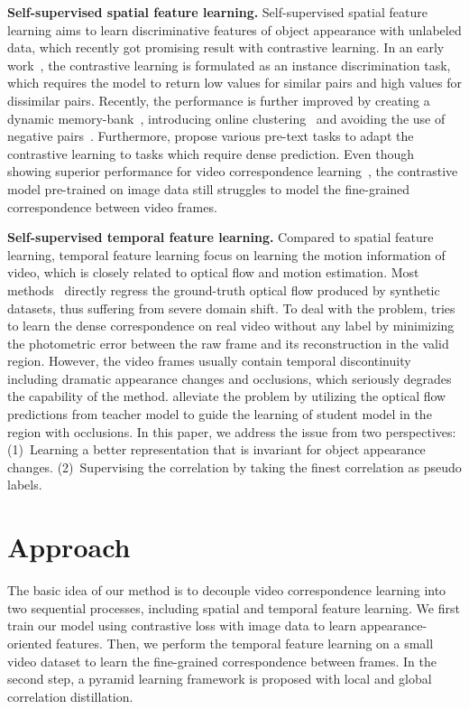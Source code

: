 \documentclass{article}
\begin{document}
\textbf{Self-supervised spatial feature learning.} Self-supervised spatial feature learning aims to learn discriminative features of object appearance with unlabeled data, which recently got promising result with contrastive learning. In an early work~\cite{wu2018unsupervised}, the contrastive learning is formulated as an instance discrimination task, which requires the model to return low values for similar pairs and high values for dissimilar pairs. Recently, the performance is further improved by creating a dynamic memory-bank~\cite{he2020momentum}, introducing online clustering~\cite{caron2020unsupervised} and avoiding the use of negative pairs~\cite{chen2021exploring}\cite{grill2020bootstrap}. Furthermore, \cite{wang2021dense}\cite{xie2021detco}\cite{yang2021instance} propose various pre-text tasks to adapt the contrastive learning to tasks which require dense prediction. Even though showing superior performance for video correspondence learning~\cite{wang2021different}, the contrastive model pre-trained on image data still struggles to model the fine-grained correspondence between video frames. 

\textbf{Self-supervised temporal feature learning. } 
Compared to spatial feature learning, temporal feature learning focus on learning the motion information of video, which is closely related to optical flow and motion estimation. Most methods~\cite{dosovitskiy2015flownet}\cite{teed2020raft} directly regress the ground-truth optical flow produced by synthetic datasets, thus suffering from severe domain shift. To deal with the problem, \cite{meister2018unflow} tries to learn the dense correspondence on real video without any label by minimizing the photometric error between the raw frame and its reconstruction in the valid region. However, the video frames usually contain temporal discontinuity including dramatic appearance changes and occlusions, which seriously degrades the capability of the method. \cite{jonschkowski2020matters}\cite{liu2020learning}\cite{liu2019ddflow} alleviate the problem by utilizing the optical flow predictions from teacher model to guide the learning of student model in the region with occlusions. In this paper, we address the issue from two perspectives: (1)~Learning a better representation that is invariant for object appearance changes. (2)~Supervising the correlation by taking the finest correlation as pseudo labels.


\section{Approach}
The basic idea of our method is to decouple video correspondence learning into two sequential processes, including spatial and temporal feature learning. We first train our model using contrastive loss with image data to learn  appearance-oriented features. Then, we perform the temporal feature learning on a small video dataset to learn the fine-grained correspondence between frames. In the second step, a pyramid learning framework is proposed with local and global correlation distillation.
\end{document}
